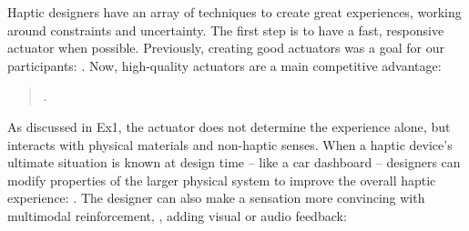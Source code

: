 

\noindent
Haptic designers have an array of techniques to create great experiences, working around constraints and uncertainty.
The first step is to have a fast, responsive actuator when possible. %
Previously, creating good actuators was a goal for our participants:
.
Now, high-quality actuators are a main competitive advantage:
\begin{quote}
.
\end{quote}

As discussed in Ex1, the actuator does not determine the experience alone, but interacts with physical materials and non-haptic senses.
When a haptic device's ultimate situation is known at design time -- like a car dashboard -- 
designers can modify 
properties of the larger physical system to improve the overall haptic experience:
.
The designer can also make a sensation more convincing with multimodal reinforcement, \eg, adding visual or audio feedback:

